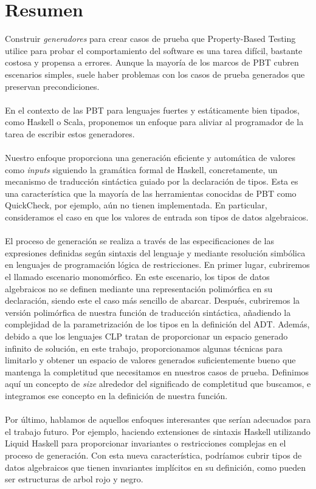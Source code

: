 \chapter*{Resumen}

Construir \textit{generadores} para crear casos de prueba que Property-Based Testing utilice para probar el comportamiento del software es una tarea difícil, bastante costosa y propensa a errores. Aunque la mayoría de los marcos de PBT cubren escenarios simples, suele haber problemas con los casos de prueba generados que preservan precondiciones.
\\\\
En el contexto de las PBT para lenguajes fuertes y estáticamente bien tipados, como Haskell o Scala, proponemos un enfoque para aliviar al programador de la tarea de escribir estos generadores.\\\\
Nuestro enfoque proporciona una generación eficiente y automática de valores como \textit{inputs} siguiendo la gramática formal de Haskell, concretamente, un mecanismo de traducción sintáctica guiado por la declaración de tipos. Esta es una característica que la mayoría de las herramientas conocidas de PBT como QuickCheck, por ejemplo, aún no tienen implementada. En particular, consideramos el caso en que los valores de entrada son tipos de datos algebraicos.\\\\
El proceso de generación se realiza a través de las especificaciones de las expresiones definidas según sintaxis del lenguaje y mediante resolución simbólica en lenguajes de programación lógica de restricciones. En primer lugar, cubriremos el llamado escenario monomórfico. En este escenario, los tipos de datos algebraicos no se definen mediante una representación polimórfica en su declaración, siendo este el caso más sencillo de abarcar. Después, cubriremos la versión polimórfica de nuestra función de traducción sintáctica, añadiendo la complejidad de la parametrización de los tipos en la definición del ADT. Además, debido a que los lenguajes CLP tratan de proporcionar un espacio generado infinito de solución, en este trabajo, proporcionamos algunas técnicas para limitarlo y obtener un espacio de valores generados suficientemente bueno que mantenga la completitud que necesitamos en nuestros casos de prueba. Definimos aquí un concepto de \textit{size} alrededor del significado de completitud que buscamos, e integramos ese concepto en la definición de nuestra función.\\\\
Por último, hablamos de aquellos enfoques interesantes que serían adecuados para el trabajo futuro. Por ejemplo, haciendo extensiones de sintaxis Haskell utilizando Liquid Haskell para proporcionar invariantes o restricciones complejas en el proceso de generación. Con esta nueva característica, podríamos cubrir tipos de datos algebraicos que tienen invariantes implícitos en su definición, como pueden ser estructuras de arbol rojo y negro.

